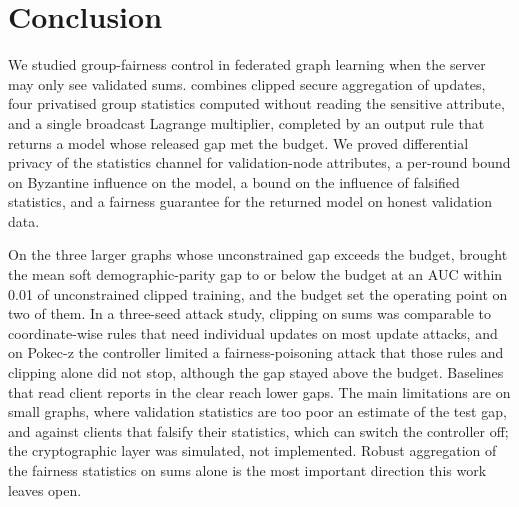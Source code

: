 \section{Conclusion}\label{sec:conclusion}

We studied group-fairness control in federated graph learning when the server may only see validated sums. \clamp{} combines clipped secure aggregation of updates, four privatised group statistics computed without reading the sensitive attribute, and a single broadcast Lagrange multiplier, completed by an output rule that returns a model whose released gap met the budget. We proved differential privacy of the statistics channel for validation-node attributes, a per-round bound on Byzantine influence on the model, a bound on the influence of falsified statistics, and a fairness guarantee for the returned model on honest validation data.

On the three larger graphs whose unconstrained gap exceeds the budget, \clamp{} brought the mean soft demographic-parity gap to or below the budget at an AUC within 0.01 of unconstrained clipped training, and the budget set the operating point on two of them. In a three-seed attack study, clipping on sums was comparable to coordinate-wise rules that need individual updates on most update attacks, and on Pokec-z the controller limited a fairness-poisoning attack that those rules and clipping alone did not stop, although the gap stayed above the budget. Baselines that read client reports in the clear reach lower gaps. The main limitations are on small graphs, where validation statistics are too poor an estimate of the test gap, and against clients that falsify their statistics, which can switch the controller off; the cryptographic layer was simulated, not implemented. Robust aggregation of the fairness statistics on sums alone is the most important direction this work leaves open.
